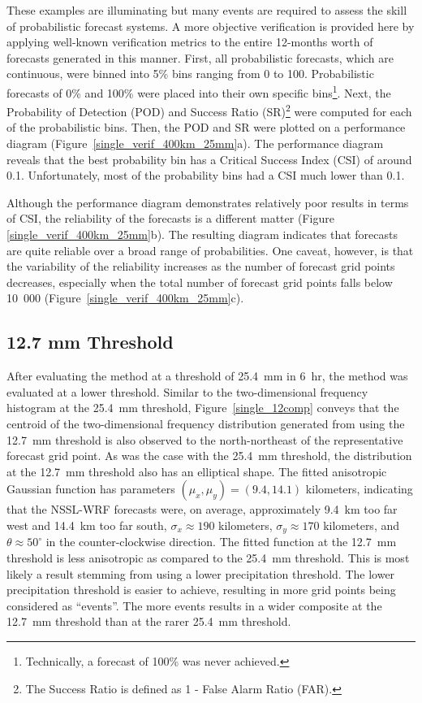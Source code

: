 These examples are illuminating but many events are required to assess the skill of probabilistic forecast systems.
A more objective verification is provided here by applying well-known verification metrics to the entire 12-months worth of forecasts generated in this manner.
First, all probabilistic forecasts, which are continuous, were binned into 5\% bins ranging from 0 to 100.
Probabilistic forecasts of 0\% and 100\% were placed into their own specific bins\footnote{Technically, a forecast of 100\% was never achieved.}.
Next, the Probability of Detection (POD) and Success Ratio (SR)\footnote{The Success Ratio is defined as 1 - False Alarm Ratio (FAR).} were computed for each of the probabilistic bins.
Then, the POD and SR were plotted on a performance diagram \citep{Roebber2009} \mbox{(Figure \ref{single_verif_400km_25mm}a)}.
The performance diagram reveals that the best probability bin has a Critical Success Index (CSI) of around 0.1.
Unfortunately, most of the probability bins had a CSI much lower than 0.1.

Although the performance diagram demonstrates relatively poor results in terms of CSI, the reliability of the forecasts is a different matter (Figure \mbox{\ref{single_verif_400km_25mm}b)}.
The resulting diagram indicates that forecasts are quite reliable over a broad range of probabilities.
One caveat, however, is that the variability of the reliability increases as the number of forecast grid points decreases, especially when the total number of forecast grid points falls below \mbox{10 000} \mbox{(Figure \ref{single_verif_400km_25mm}c)}.




\subsection{12.7 mm Threshold}
\label{dresults_12.7mm}

After evaluating the method at a threshold of \mbox{25.4 mm} in \mbox{6 hr}, the method was evaluated at a lower threshold.
Similar to the two-dimensional frequency histogram at the \mbox{25.4 mm} threshold, \mbox{Figure \ref{single_12comp}} conveys that the centroid of the two-dimensional frequency distribution generated from using the \mbox{12.7 mm} threshold is also observed to the north-northeast of the representative forecast grid point.
As was the case with the \mbox{25.4 mm} threshold, the distribution at the \mbox{12.7 mm} threshold also has an elliptical shape.
The fitted anisotropic Gaussian function has parameters $(\mu_x, \mu_y) = (9.4, 14.1)$ kilometers, indicating that the NSSL-WRF forecasts were, on average, approximately \mbox{9.4 km} too far west and \mbox{14.4 km} too far south, $\sigma_x \approx 190$ kilometers, $\sigma_y \approx 170$ kilometers, and $\theta \approx 50^{\circ}$ in the counter-clockwise direction.
The fitted function at the \mbox{12.7 mm} threshold is less anisotropic as compared to the \mbox{25.4 mm} threshold.
This is most likely a result stemming from using a lower precipitation threshold.
The lower precipitation threshold is easier to achieve, resulting in more grid points being considered as ``events''.
The more events results in a wider composite at the \mbox{12.7 mm} threshold than at the rarer \mbox{25.4 mm} threshold.


